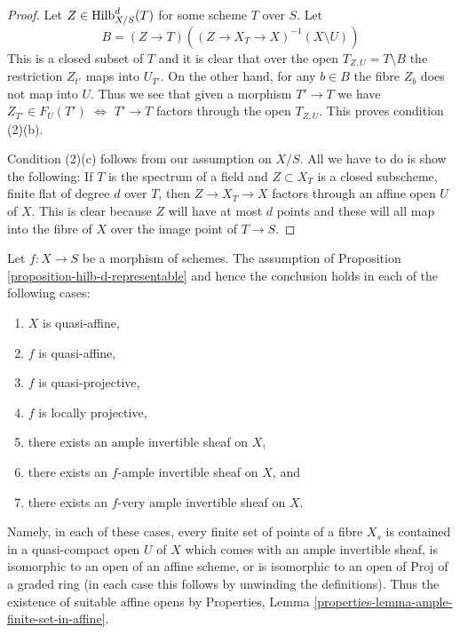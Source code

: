 \begin{proof}
\medskip\noindent
Let $Z \in \mathrm{Hilb}^d_{X/S}(T)$ for some scheme $T$ over $S$. Let
$$
B = (Z \to T)\left((Z \to X_T \to X)^{-1}(X \setminus U)\right)
$$
This is a closed subset of $T$ and it is clear that over the open
$T_{Z, U} = T \setminus B$ the restriction $Z_{t'}$ maps into $U_{T'}$.
On the other hand, for any $b \in B$ the fibre $Z_b$ does not map
into $U$. Thus we see that given a morphism $T' \to T$ we
have $Z_{T'} \in F_U(T')$ $\Leftrightarrow$ $T' \to T$ factors through
the open $T_{Z, U}$. This proves condition (2)(b).

\medskip\noindent
Condition (2)(c) follows from our assumption on $X/S$. All we have
to do is show the following: If $T$ is the spectrum of a field
and $Z \subset X_T$ is a closed subscheme, finite flat of degree
$d$ over $T$, then $Z \to X_T \to X$ factors through an affine open
$U$ of $X$. This is clear because $Z$ will have at most $d$ points
and these will all map into the fibre of $X$ over the image point
of $T \to S$.
\end{proof}

\begin{remark}
\label{remark-when-proposition-applies}
Let $f : X \to S$ be a morphism of schemes. The assumption of
Proposition \ref{proposition-hilb-d-representable} and
hence the conclusion holds in each of the following cases:
\begin{enumerate}
\item $X$ is quasi-affine,
\item $f$ is quasi-affine,
\item $f$ is quasi-projective,
\item $f$ is locally projective,
\item there exists an ample invertible sheaf on $X$,
\item there exists an $f$-ample invertible sheaf on $X$, and
\item there exists an $f$-very ample invertible sheaf on $X$.
\end{enumerate}
Namely, in each of these cases, every finite set of points of
a fibre $X_s$ is contained in a quasi-compact open $U$ of $X$
which comes with an ample invertible sheaf, is isomorphic
to an open of an affine scheme, or is isomorphic to an open
of $\text{Proj}$ of a graded ring (in each case this follows
by unwinding the definitions). Thus the existence of suitable
affine opens by
Properties, Lemma \ref{properties-lemma-ample-finite-set-in-affine}.
\end{remark}




